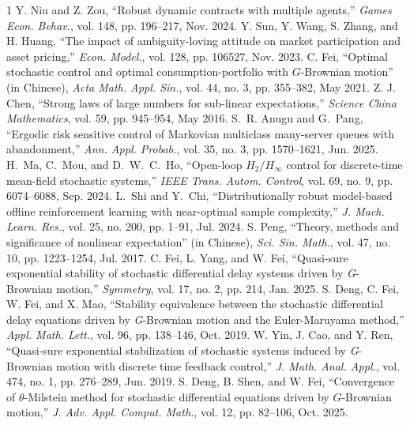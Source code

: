 \documentclass[onecolumn, journal]{IEEEtran} %
\begin{document}
\begin{thebibliography}{1}
		Y. Niu and Z. Zou, ``Robust dynamic contracts with multiple agents,'' \textit{Games Econ. Behav.}, vol. 148, pp. 196--217, Nov. 2024.
		Y. Sun, Y. Wang, S. Zhang, and H. Huang, ``The impact of ambiguity-loving attitude on market participation and asset pricing,'' \textit{Econ. Model.}, vol. 128, pp. 106527, Nov. 2023.
		C. Fei, ``Optimal stochastic control and optimal consumption-portfolio with $G$-Brownian motion'' (in Chinese), \textit{Acta Math. Appl. Sin.}, vol. 44, no. 3, pp. 355--382, May 2021.
		Z. J. Chen, ``Strong laws of large numbers for sub-linear expectations,'' \textit{Science China Mathematics}, vol. 59, pp. 945--954, May 2016.
		S.~R. Anugu and G.~Pang, ``Ergodic risk sensitive control of Markovian multiclass many-server queues with abandonment,'' \textit{Ann. Appl. Probab.}, vol. 35, no. 3, pp. 1570--1621, Jun. 2025.
		H.~Ma, C.~Mou, and D.~W.~C.~Ho, ``Open-loop $H_2/H_\infty$ control for discrete-time mean-field stochastic systems,'' \textit{IEEE Trans. Autom. Control}, vol. 69, no. 9, pp. 6074--6088, Sep. 2024.
		L.~Shi and Y.~Chi, ``Distributionally robust model-based offline reinforcement learning with near-optimal sample complexity,'' \textit{J. Mach. Learn. Res.}, vol. 25, no. 200, pp. 1--91, Jul. 2024.
		S. Peng, ``Theory, methods and significance of nonlinear expectation'' (in Chinese), \textit{Sci. Sin. Math.}, vol. 47, no. 10, pp. 1223--1254, Jul. 2017.
		C. Fei, L. Yang, and W. Fei, ``Quasi-sure exponential stability of stochastic differential delay systems driven by \textit{G}-Brownian motion,'' \textit{Symmetry}, vol. 17, no. 2, pp. 214, Jan. 2025.
		S. Deng, C. Fei, W. Fei, and X. Mao, ``Stability equivalence between the stochastic differential delay equations driven by \textit{G}-Brownian motion and the Euler-Maruyama method,'' \textit{Appl. Math. Lett.}, vol. 96, pp. 138--146, Oct. 2019.
		W. Yin, J. Cao, and Y. Ren, ``Quasi-sure exponential stabilization of stochastic systems induced by \textit{G}-Brownian motion with discrete time feedback control,'' \textit{J. Math. Anal. Appl.}, vol. 474, no. 1, pp. 276--289, Jun. 2019.
		S. Deng, B. Shen, and W. Fei, ``Convergence of $\theta$-Milstein method for stochastic differential equations driven by $G$-Brownian motion,'' \textit{J. Adv. Appl. Comput. Math.}, vol. 12, pp. 82--106, Oct. 2025.
	\end{thebibliography}
\end{document}
